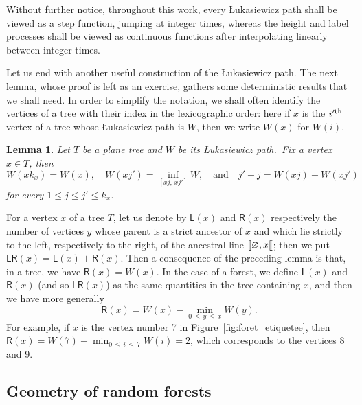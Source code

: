 \documentclass[10pt]{amsart}
\newtheorem{lemm}[theo]{Lemma}\newtheorem{prop}[theo]{Proposition}\newtheorem{coro}[theo]{Corollary}\newtheorem{conj}[theo]{Conjecture}
\theoremstyle{definition}\newtheorem{defi}[theo]{Definition}\newtheorem{rema}[theo]{Remark}\newtheorem{exam}[theo]{Example}\newtheorem{exem}[theo]{Example}\newtheorem{nota}[theo]{Notation}
\newcommand{\llbracket}{\mathopen{[\mkern -2.7mu[}}
\newcommand{\1}{\ensembles{1}}
\renewcommand{\le}{\leqslant}
\newcommand{\LL}{\mathsf{L}}
\newcommand{\RR}{\mathsf{R}}
\newcommand{\LR}{\mathsf{LR}}
\providecommand{\?}{}
\begin{document}
Without further notice, throughout this work, every {\L}ukasiewicz path shall be viewed as a step function, jumping at integer times, whereas the height and label processes shall be viewed as continuous functions after interpolating linearly between integer times.


Let us end with another useful construction of the {\L}ukasiewicz path. The next lemma, whose proof is left as an exercise, gathers some deterministic results that we shall need. In order to simplify the notation, we shall often identify the vertices of a tree with their index in the lexicographic order: here if $x$ is the $i'^{\rm th}$ vertex of a tree whose {\L}ukasiewicz path is $W$, then we write $W(x)$ for $W(i)$.

\begin{lemm}\label{lem:codage_marche_Luka}
Let $T$ be a plane tree and $W$ be its {\L}ukasiewicz path.~Fix a vertex $x \in T$, then
\[
W(x k_x) = W(x),
\quad W(xj') = \inf_{\left[xj,\,xj'\right]} W,
\quad\text{and}\quad j' - j = W(xj) - W(xj')
\]
for every $1 \le j \le j' \le k_x$.
\end{lemm}



For a vertex $x$ of a tree $T$, let us denote by $\LL(x)$ and $\RR(x)$ respectively the number of vertices $y$ whose parent is a strict ancestor of $x$ and which lie strictly to the left, respectively to the right, of the ancestral line $\llbracket \varnothing, x\llbracket$; then we put $\LR(x) = \LL(x) + \RR(x)$. Then a consequence of the preceding lemma is that, in a tree, we have $\RR(x) = W(x)$. In the case of a forest, we define $\LL(x)$ and $\RR(x)$ (and so $\LR(x)$) as the same quantities in the tree containing $x$, and then we have more generally
\begin{equation}\label{eq:def_X_discret}
\RR(x) = W(x) - \min_{0\,\le\,y\,\le\,x} W(y).
\end{equation}
For example, if $x$ is the vertex number 7 in Figure~\ref{fig:foret_etiquetee}, then $\RR(x) = W(7) - \min_{0\,\le\,i\,\le\,7} W(i) = 2$, which corresponds to the vertices 8 and 9.



\subsection{Geometry of random forests}\label{sec:arbres_etiquetes}
\end{document}
